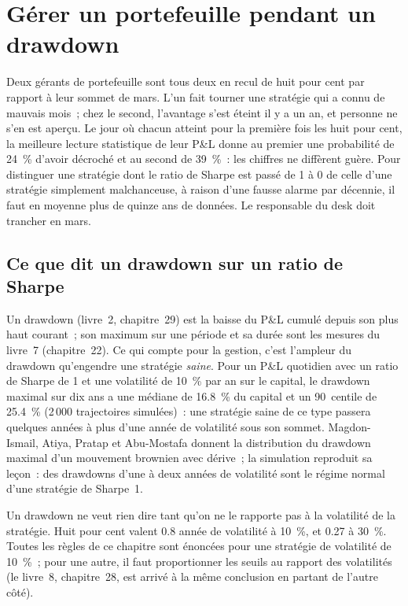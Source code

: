 \chapter{Gérer un portefeuille pendant un drawdown}\label{ch:fm:managing-a-book-through-drawdown}

Deux gérants de portefeuille sont tous deux en recul de huit pour cent par rapport à leur sommet de mars. L'un fait tourner une stratégie qui a connu de mauvais mois~; chez le second,
l'avantage s'est éteint il y a un an, et personne ne s'en est aperçu. Le jour où chacun atteint pour la première fois les huit pour cent, la meilleure lecture statistique de leur P\&L donne
au premier une probabilité de 24~\% d'avoir décroché et au second de 39~\%~: les chiffres ne diffèrent guère. Pour distinguer une stratégie dont le ratio de Sharpe est passé de 1
à 0 de celle d'une stratégie simplement malchanceuse, à raison d'une fausse alarme par décennie, il faut en moyenne plus de quinze ans de données. Le responsable du desk
doit trancher en mars.

\section{Ce que dit un drawdown sur un ratio de Sharpe}

Un drawdown (livre~2, chapitre~29) est la baisse du P\&L cumulé depuis son plus haut courant~; son maximum sur une période et sa durée sont
les mesures du livre~7 (chapitre~22). Ce qui compte pour la gestion, c'est l'ampleur du drawdown qu'engendre une stratégie \emph{saine}. Pour un P\&L quotidien avec un
ratio de Sharpe de 1 et une volatilité de 10~\% par an sur le capital, le drawdown maximal sur dix ans a une médiane de 16.8~\% du capital et un
90~centile de 25.4~\% (2\,000 trajectoires simulées)~: une stratégie saine de ce type passera quelques années à plus d'une année de volatilité sous
son sommet. Magdon-Ismail, Atiya, Pratap et Abu-Mostafa donnent la distribution du drawdown maximal d'un mouvement brownien avec dérive~; la
simulation reproduit sa leçon~: des drawdowns d'une à deux années de volatilité sont le régime normal d'une stratégie de Sharpe~1.

\begin{remark}[Unités]\label{rem:fm:managing-a-book-through-drawdown:units}
Un drawdown ne veut rien dire tant qu'on ne le rapporte pas à la volatilité de la stratégie. Huit pour cent valent 0.8 année de volatilité à 10~\%, et 0.27 à 30~\%.
Toutes les règles de ce chapitre sont énoncées pour une stratégie de volatilité de 10~\%~; pour une autre, il faut proportionner les seuils au rapport des volatilités (le
livre~8, chapitre~28, est arrivé à la même conclusion en partant de l'autre côté).
\end{remark}

